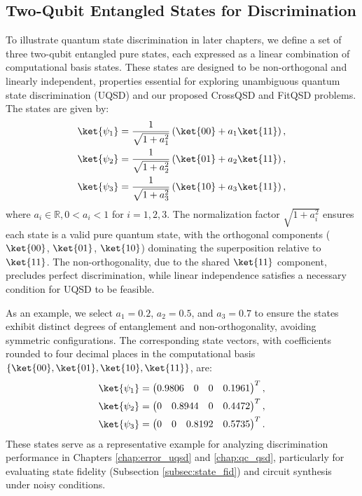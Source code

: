 \subsection{Two-Qubit Entangled States for Discrimination}
\label{subsec:entangled_states}
To illustrate quantum state discrimination in later chapters, we define a set
of three two-qubit entangled pure states, each expressed as a linear
combination of computational basis states.
These states are designed to be non-orthogonal and linearly independent,
properties essential for exploring unambiguous quantum state discrimination
(UQSD) and our proposed CrossQSD and FitQSD problems.
The states are given by:
\begin{align}
    \ket{\psi_1} & = \frac{1}{\sqrt{1 + a_1^2}} \left( \ket{00} + a_1 \ket{11} \right), \\
    \ket{\psi_2} & = \frac{1}{\sqrt{1 + a_2^2}} \left( \ket{01} + a_2 \ket{11} \right), \\
    \ket{\psi_3} & = \frac{1}{\sqrt{1 + a_3^2}} \left( \ket{10} + a_3 \ket{11} \right),
\end{align}
where \( a_i \in \mathbb{R}, 0 < a_i < 1 \) for \( i = 1, 2, 3 \).
The normalization factor \( \sqrt{1 + a_i^2} \) ensures each state is a valid
pure quantum state, with the orthogonal components (\(\ket{00}\), \(\ket{01}\), \(\ket{10}\))
dominating the superposition relative to \(\ket{11}\).
The non-orthogonality, due to the shared \(\ket{11}\) component, precludes
perfect discrimination, while linear independence satisfies a necessary
condition for UQSD to be feasible.

As an example, we select \( a_1 = 0.2 \), \( a_2 = 0.5 \), and \( a_3 = 0.7 \)
to ensure the states exhibit distinct degrees of entanglement and non-orthogonality,
avoiding symmetric configurations.
The corresponding state vectors, with coefficients rounded to four decimal
places in the computational basis \(\{ \ket{00}, \ket{01}, \ket{10}, \ket{11} \}\), are:
\begin{align}
    \ket{\psi_1} & = \begin{pmatrix} 0.9806 & 0 & 0 & 0.1961 \end{pmatrix}^T,                                \\
    \ket{\psi_2} & = \begin{pmatrix} 0 & 0.8944 & 0 & 0.4472 \end{pmatrix}^T,                                \\
    \ket{\psi_3} & = \begin{pmatrix} 0 & 0 & 0.8192 & 0.5735 \end{pmatrix}^T. \label{eq:entangled_state_set}
\end{align}
These states serve as a representative example for analyzing discrimination
performance in Chapters \ref{chap:error_uqsd} and \ref{chap:qc_qsd},
particularly for evaluating state fidelity (Subsection \ref{subsec:state_fid})
and circuit synthesis under noisy conditions.

